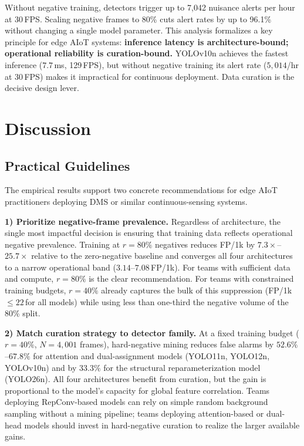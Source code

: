 \documentclass[conference]{IEEEtran}
\begin{document}
Without negative training, detectors trigger up to 7{,}042 nuisance
alerts per hour at 30\,FPS. Scaling negative frames to 80\% cuts
alert rates by up to 96.1\% without changing a single model
parameter. This analysis formalizes a key principle for edge AIoT
systems: \textbf{inference latency is architecture-bound; operational
reliability is curation-bound.} YOLOv10n achieves the fastest
inference ($7.7$\,ms, 129\,FPS), but without negative training its
alert rate ($5{,}014$/hr at 30\,FPS) makes it impractical for
continuous deployment. Data curation is the decisive design lever.

\section{Discussion}
\label{sec:discussion}

\subsection{Practical Guidelines}

The empirical results support two concrete recommendations for edge
AIoT practitioners deploying DMS or similar continuous-sensing
systems.

\noindent\textbf{1) Prioritize negative-frame prevalence.}
Regardless of architecture, the single most impactful decision is
ensuring that training data reflects operational negative prevalence.
Training at $r{=}80\%$ negatives reduces FP/1k by $7.3\times$--$25.7\times$
relative to the zero-negative baseline and converges all four
architectures to a narrow operational band ($3.14$--$7.08$\,FP/1k).
For teams with sufficient data and compute, $r{=}80\%$ is the clear
recommendation. For teams with constrained training budgets, $r{=}40\%$
already captures the bulk of this suppression (FP/1k
$\le 22$\,for all models) while using less than one-third the
negative volume of the 80\% split.

\noindent\textbf{2) Match curation strategy to detector family.}
At a fixed training budget ($r{=}40\%$, $N{=}4{,}001$ frames),
hard-negative mining reduces false alarms by $52.6\%$--$67.8\%$
for attention and dual-assignment models (YOLO11n, YOLO12n,
YOLOv10n) and by $33.3\%$ for the structural reparameterization
model (YOLO26n). All four architectures benefit from curation, but
the gain is proportional to the model's capacity for global feature
correlation. Teams deploying RepConv-based models can rely on simple
random background sampling without a mining pipeline; teams
deploying attention-based or dual-head models should invest in
hard-negative curation to realize the larger available gains.
\end{document}
